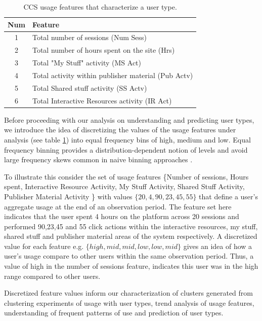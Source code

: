 \documentclass{acm_proc_article-sp}
\begin{document}
\begin{table}

\centering
\caption{CCS usage features that characterize a user type.  }
\label{usagefeatures}
\begin{tabular}{|c|p{6.75cm}|} 
\hline
Num & Feature \\ \hline
1 & Total number of sessions (Num Sess) \\ \hline
2 & Total number of hours spent on the site (Hrs) \\ \hline
3 & Total "My Stuff" activity (MS Act) \\ \hline
4 & Total activity within publisher material (Pub Actv)\\ \hline
5 & Total Shared stuff activity (SS Actv) \\ \hline
6 & Total Interactive Resources activity (IR Act)	\\ \hline
\end{tabular}
\end{table}
Before proceeding with our analysis on understanding and predicting user types, we introduce the idea of discretizing the values of the usage features under analysis (see table \ref{usagefeatures}) into equal frequency bins of high, medium and low. Equal frequency binning provides a distribution-dependent notion of levels and avoid large frequency skews common in naive binning approaches \cite{han2006data}.

 To illustrate this consider the set of usage features \{Number of sessions, Hours spent, Interactive Resource Activity, My Stuff Activity, Shared Stuff Activity, Publisher Material Activity \} with values $\{20,4,90,23,45,55 \}$ that define a user's aggregate usage at the end of an observation period. The feature set here indicates that the user spent 4 hours on the platform across 20 sessions and performed 90,23,45 and 55 click actions within the interactive resources, my stuff, shared stuff and publisher material areas of the system respectively. A discretized value for each feature e.g. $\{high,mid,mid,low,low, mid\}$ gives an idea of how a user's usage compare to other users within the same observation period. Thus, a value of high in the number of sessions feature, indicates this user was in the high range compared to other users.
 
 Discretized feature values inform our characterization of clusters generated from  clustering experiments of usage  with user types, trend analysis of usage features, understanding of frequent patterns of use and prediction of user types. 
 
\end{document}
